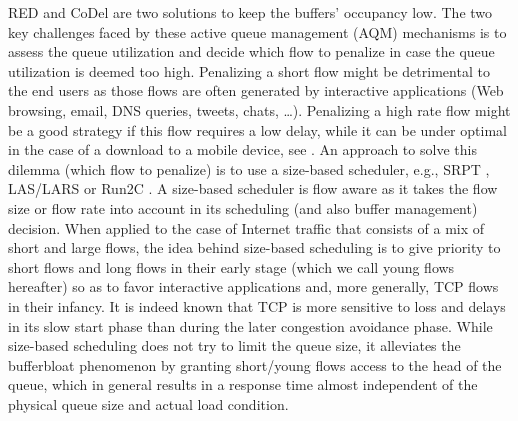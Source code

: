 \documentclass[preprint,12pt]{elsarticle}
\begin{document}
RED and CoDel are two solutions to keep the buffers' occupancy low. 
The two key challenges faced by these active queue management (AQM) mechanisms is to assess the queue utilization and decide which flow to penalize in case the queue utilization is deemed too high. Penalizing a short flow might be detrimental to the end users as those flows are often generated by interactive applications (Web browsing, email, DNS queries, tweets, chats, \ldots). Penalizing a high rate flow might be a good strategy if this flow requires a low delay, while it can be under optimal in the case of a download to a mobile device, see \cite{sivaraman2013no}. An approach to solve this dilemma (which flow to penalize) is to  use a size-based scheduler, e.g., SRPT \cite{kleinrock_76_queueing},  LAS/LARS \cite{Rai02size-basedscheduling,Martin10Lars} or Run2C \cite{Avrachenkov04Run2c}. A size-based scheduler is flow aware as it takes the flow size or flow rate into account in its scheduling (and also buffer management) decision. When applied to the case of Internet traffic that consists of a mix of short and large flows, the idea behind size-based scheduling is to give priority to short flows and long flows in their early stage (which we call young flows hereafter) so as to favor interactive applications and, more generally, TCP flows in their infancy. It is indeed known that TCP is more sensitive to loss and delays in its slow start phase than during the later congestion avoidance phase. While size-based scheduling does not try to limit the queue size, it alleviates the bufferbloat  phenomenon by granting short/young flows access to the head of the queue, which in general results in a response time almost independent of the physical queue size and actual load condition. 
\end{document}
